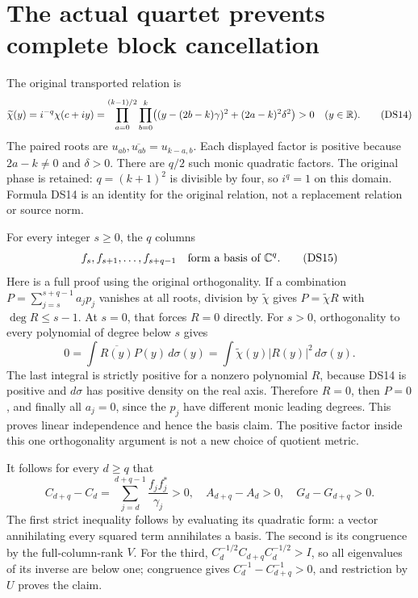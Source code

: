 \documentclass[11pt]{article}
\begin{document}
\section{The actual quartet prevents complete block cancellation}

The original transported relation is
\begin{equation}\label{dsroot:eq:positive-relation}
\widetilde\chi(y)=i^{-q}\chi(c+iy)
=\prod_{a=0}^{(k-1)/2}\prod_{b=0}^{k}
\bigl((y-(2b-k)\gamma)^2+(2a-k)^2\delta^2\bigr)>0
\quad(y\in\mathbb R).
\tag{DS14}
\end{equation}
The paired roots are \(u_{ab},\overline{u_{ab}}=u_{k-a,b}\).
Each displayed factor is positive because \(2a-k\ne0\) and
\(\delta>0\). There are \(q/2\) such monic quadratic factors.
The original phase is retained: \(q=(k+1)^2\) is divisible by four,
so \(i^q=1\) on this domain. Formula DS14 is an identity for the
original relation, not a replacement relation or source norm.

For every integer \(s\geq0\), the \(q\) columns
\begin{equation}\label{dsroot:eq:tailbasis}
f_s,f_{s+1},\ldots,f_{s+q-1}
\quad\text{form a basis of }\mathbb C^q.
\tag{DS15}
\end{equation}
Here is a full proof using the original orthogonality. If a combination
\(P=\sum_{j=s}^{s+q-1}a_jp_j\) vanishes at all roots, division by
\(\widetilde\chi\) gives \(P=\widetilde\chi R\) with
\(\deg R\leq s-1\). At \(s=0\), that forces \(R=0\) directly.
For \(s>0\), orthogonality to every polynomial of degree below \(s\)
gives
\[
0=\int\overline{R(y)}P(y)\,d\sigma(y)
=\int\widetilde\chi(y)|R(y)|^2\,d\sigma(y).
\]
The last integral is strictly positive for a nonzero polynomial
\(R\), because DS14 is positive and \(d\sigma\) has positive density
on the real axis. Therefore \(R=0\), then \(P=0\), and finally all
\(a_j=0\), since the \(p_j\) have different monic leading degrees.
This proves linear independence and hence the basis claim. The
positive factor inside this one orthogonality argument is not a new
choice of quotient metric.

It follows for every \(d\geq q\) that
\begin{equation}\label{dsroot:eq:strictblocks}
C_{d+q}-C_d=\sum_{j=d}^{d+q-1}\frac{f_jf_j^*}{\gamma_j}>0,
\quad A_{d+q}-A_d>0,
\quad G_d-G_{d+q}>0.
\tag{DS16}
\end{equation}
The first strict inequality follows by evaluating its quadratic form:
a vector annihilating every squared term annihilates a basis. The second
is its congruence by the full-column-rank \(V\). For the third,
\(C_d^{-1/2}C_{d+q}C_d^{-1/2}>I\), so all eigenvalues of its inverse
are below one; congruence gives \(C_d^{-1}-C_{d+q}^{-1}>0\), and
restriction by \(U\) proves the claim.
\end{document}
